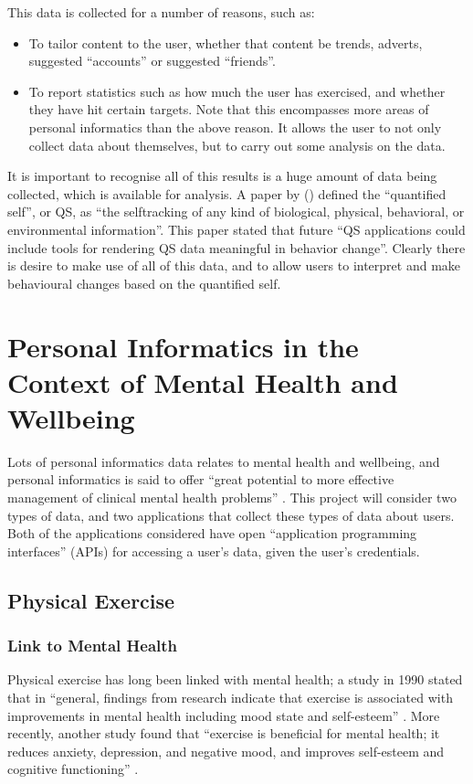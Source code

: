 \documentclass[11pt,openright,a4paper]{report}
\begin{document}
This data is collected for a number of reasons, such as:
\begin{itemize}
\item To tailor content to the user, whether that content be trends, adverts, suggested \enquote{accounts} or suggested \enquote{friends}.
\item To report statistics such as how much the user has exercised, and whether they have hit certain targets. Note that this encompasses more areas of personal informatics than the above reason. It allows the user to not only collect data about themselves, but to carry out some analysis on the data.
\end{itemize}

It is important to recognise all of this results is a huge amount of data being collected, which is available for analysis. A paper by \citeauthor{swan2013quantified} (\citeyear{swan2013quantified}) defined the \enquote{quantified self}, or QS, as \enquote{the selftracking of any kind of biological, physical, behavioral, or environmental information}. This paper stated that future \enquote{QS applications could include tools for rendering QS data meaningful in behavior change}. Clearly there is desire to make use of all of this data, and to allow users to interpret and make behavioural changes based on the quantified self.

\section{Personal Informatics in the Context of Mental Health and Wellbeing} \label{personalinformaticsmentalhealth}
Lots of personal informatics data relates to mental health and wellbeing, and personal informatics is said to offer \enquote{great potential to more effective management of clinical
mental health problems} \parencite{pimentalhealth}. This project will consider two types of data, and two applications that collect these types of data about users. Both of the applications considered have open \enquote{application programming interfaces} (APIs) for accessing a user's data, given the user's credentials.

\subsection{Physical Exercise}
\subsubsection{Link to Mental Health}
Physical exercise has long been linked with mental health; a study in 1990 stated that in \enquote{general, findings from research indicate that exercise is associated with improvements in mental health including mood state and self-esteem} \parencite{raglin1990exercise}. More recently, another study found that \enquote{exercise is beneficial for mental health; it reduces anxiety, depression, and negative mood, and improves self-esteem and cognitive functioning} \parencite{callaghan2004exercise}.
\end{document}
